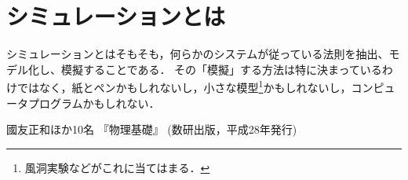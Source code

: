 \documentclass[b5paper]{ujreport}
\begin{document}
\section{シミュレーションとは}
シミュレーションとはそもそも，何らかのシステムが従っている法則を抽出、モデル化し、模擬することである．
その「模擬」する方法は特に決まっているわけではなく，紙とペンかもしれないし，小さな模型\footnote{風洞実験などがこれに当てはまる．}かもしれないし，コンピュータプログラムかもしれない．


\begin{thebibliography}{99}
 國友正和ほか10名 『物理基礎』 (数研出版，平成28年発行)
\end{thebibliography}
\end{document}
